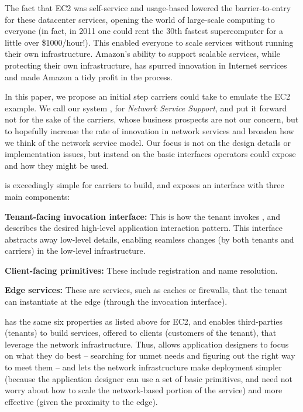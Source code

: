 The fact that EC2 was self-service and usage-based lowered the barrier-to-entry for these datacenter services, opening the world of large-scale computing to everyone (in fact, in 2011 one could rent the 30th fastest supercomputer for a little over \$1000/hour!). This enabled everyone to scale services without running their own infrastructure. Amazon's ability to support scalable services, while protecting their own infrastructure, has spurred innovation in Internet services and made Amazon a tidy profit in the process.

In this paper, we propose an initial step carriers could take to emulate the EC2 example. We call our system \name, for {\em Network Service Support}, and put it forward not for the sake of the carriers, whose business prospects are not our concern, but to hopefully increase the rate of innovation in network services and broaden how we think of the network service model. Our focus is not on the design details or implementation  issues, but instead on the basic interfaces operators could expose and how they might be used.  

\name is exceedingly simple for carriers to build, and exposes an interface with three main components:

\begin{compactitem}
\item {\bf Tenant-facing invocation interface:}  This is how the tenant invokes \name, and describes the desired high-level application interaction pattern. This interface abstracts away low-level details, enabling seamless changes (by both tenants and carriers) in the low-level infrastructure.
\item {\bf Client-facing primitives:} These include registration and name resolution.
\item {\bf Edge services:} These are services, such as caches or firewalls, that the tenant can instantiate at the edge (through the invocation interface).
\end{compactitem}

\name has the same six properties as listed above for EC2, and enables third-parties (tenants) to  build services, offered to clients (customers of the tenant), that leverage the network infrastructure. Thus, \name allows application designers to focus on what they do best -- searching for unmet needs and figuring out the right way to meet them -- and lets the network infrastructure make deployment simpler (because the application designer can use a set of basic primitives, and need not worry about how to scale the network-based portion of the service) and more effective (given the proximity to the edge). 

